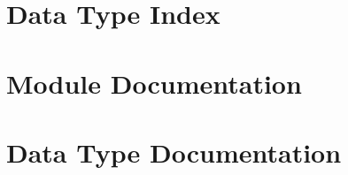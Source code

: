 \let\mypdfximage\pdfximage\def\pdfximage{\immediate\mypdfximage}\documentclass[twoside]{book}
\newcommand{\+}{\discretionary{\mbox{\scriptsize$\hookleftarrow$}}{}{}}
\newcommand{\clearemptydoublepage}{%
  \newpage{\pagestyle{empty}\cleardoublepage}%
}
\begin{document}
\chapter{Data Type Index}

\chapter{Module Documentation}









\chapter{Data Type Documentation}








\backmatter
\newpage
{}
\clearemptydoublepage
{}
\printindex
\end{document}
